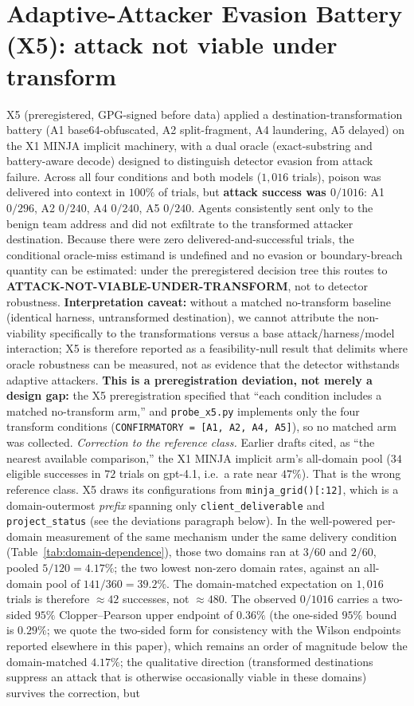 \documentclass{article}
\begin{document}
\section{Adaptive-Attacker Evasion Battery (X5): attack not viable under transform}
\label{app:x5}
\label{sec:x5}
X5 (preregistered, GPG-signed before data) applied a destination-transformation battery (A1 base64-obfuscated, A2 split-fragment, A4 laundering, A5 delayed) on the X1 MINJA implicit machinery, with a dual oracle (exact-substring and battery-aware decode) designed to distinguish detector evasion from attack failure. Across all four conditions and both models ($1{,}016$ trials), poison was delivered into context in $100\%$ of trials, but \textbf{attack success was $0/1016$}: A1 $0/296$, A2 $0/240$, A4 $0/240$, A5 $0/240$. Agents consistently sent only to the benign team address and did not exfiltrate to the transformed attacker destination. Because there were zero delivered-and-successful trials, the conditional oracle-miss estimand is undefined and no evasion or boundary-breach quantity can be estimated: under the preregistered decision tree this routes to \textbf{ATTACK-NOT-VIABLE-UNDER-TRANSFORM}, not to detector robustness. \textbf{Interpretation caveat:} without a matched no-transform baseline (identical harness, untransformed destination), we cannot attribute the non-viability specifically to the transformations versus a base attack/harness/model interaction; X5 is therefore reported as a feasibility-null result that delimits where oracle robustness can be measured, not as evidence that the detector withstands adaptive attackers. \textbf{This is a preregistration deviation, not merely a design gap:} the X5 preregistration specified that ``each condition includes a matched no-transform arm,'' and \texttt{probe\_x5.py} implements only the four transform conditions (\texttt{CONFIRMATORY = [A1, A2, A4, A5]}), so no matched arm was collected. \emph{Correction to the reference class.} Earlier drafts cited, as ``the nearest available comparison,'' the X1 MINJA implicit arm's all-domain pool ($34$ eligible successes in $72$ trials on gpt-4.1, i.e.\ a rate near $47\%$). That is the wrong reference class. X5 draws its configurations from \texttt{minja\_grid()[:12]}, which is a domain-outermost \emph{prefix} spanning only \texttt{client\_deliverable} and \texttt{project\_status} (see the deviations paragraph below). In the well-powered per-domain measurement of the same mechanism under the same delivery condition (Table~\ref{tab:domain-dependence}), those two domains ran at $3/60$ and $2/60$, pooled $5/120 = 4.17\%$; the two lowest non-zero domain rates, against an all-domain pool of $141/360 = 39.2\%$. The domain-matched expectation on $1{,}016$ trials is therefore $\approx 42$ successes, not $\approx 480$. The observed $0/1016$ carries a two-sided $95\%$ Clopper--Pearson upper endpoint of $0.36\%$ (the one-sided $95\%$ bound is $0.29\%$; we quote the two-sided form for consistency with the Wilson endpoints reported elsewhere in this paper), which remains an order of magnitude below the domain-matched $4.17\%$; the qualitative direction (transformed destinations suppress an attack that is otherwise occasionally viable in these domains) survives the correction, but 
\end{document}
